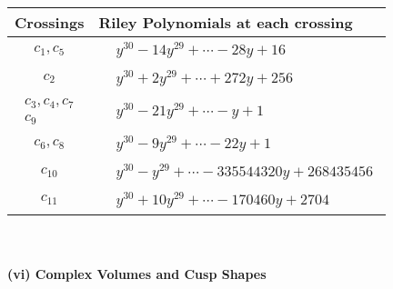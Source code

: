 \documentclass[1p]{elsarticle_modified}
\theoremstyle{definition}
\begin{document}
\begin{tabular}{m{50pt}|m{274pt}}
Crossings & \hspace{64pt}Riley Polynomials at each crossing \\
\hline $$\begin{aligned}c_{1},c_{5}\end{aligned}$$&$\begin{aligned}
&y^{30}-14 y^{29}+\cdots-28 y+16
\end{aligned}$\\
\hline $$\begin{aligned}c_{2}\end{aligned}$$&$\begin{aligned}
&y^{30}+2 y^{29}+\cdots+272 y+256
\end{aligned}$\\
\hline $$\begin{aligned}c_{3},c_{4},c_{7}\\c_{9}\end{aligned}$$&$\begin{aligned}
&y^{30}-21 y^{29}+\cdots- y+1
\end{aligned}$\\
\hline $$\begin{aligned}c_{6},c_{8}\end{aligned}$$&$\begin{aligned}
&y^{30}-9 y^{29}+\cdots-22 y+1
\end{aligned}$\\
\hline $$\begin{aligned}c_{10}\end{aligned}$$&$\begin{aligned}
&y^{30}- y^{29}+\cdots-335544320 y+268435456
\end{aligned}$\\
\hline $$\begin{aligned}c_{11}\end{aligned}$$&$\begin{aligned}
&y^{30}+10 y^{29}+\cdots-170460 y+2704
\end{aligned}$\\
\hline
\end{tabular}\\~\\
\newpage\flushleft \textbf{(vi) Complex Volumes and Cusp Shapes}
\end{document}
